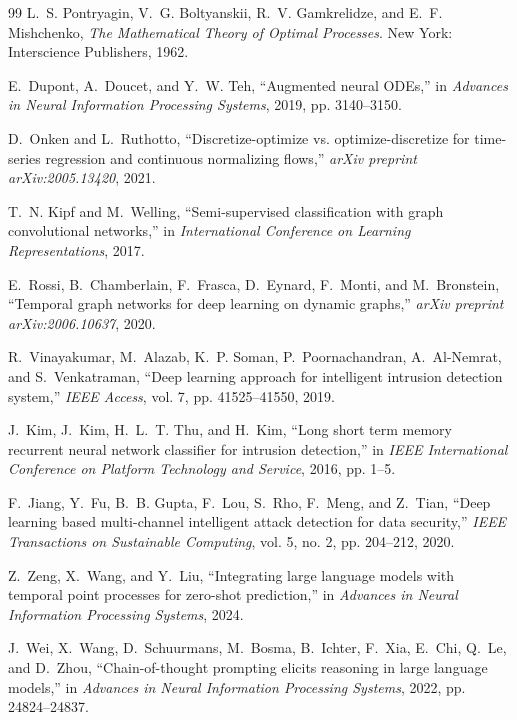\documentclass[lettersize,journal]{IEEEtran}
\begin{document}
\begin{thebibliography}{99}
L.~S. Pontryagin, V.~G. Boltyanskii, R.~V. Gamkrelidze, and E.~F. Mishchenko,
\emph{The Mathematical Theory of Optimal Processes}.
New York: Interscience Publishers, 1962.

E.~Dupont, A.~Doucet, and Y.~W. Teh,
``Augmented neural ODEs,''
in \emph{Advances in Neural Information Processing Systems}, 2019, pp. 3140--3150.

D.~Onken and L.~Ruthotto,
``Discretize-optimize vs. optimize-discretize for time-series regression and continuous normalizing flows,''
\emph{arXiv preprint arXiv:2005.13420}, 2021.

T.~N. Kipf and M.~Welling,
``Semi-supervised classification with graph convolutional networks,''
in \emph{International Conference on Learning Representations}, 2017.

E.~Rossi, B.~Chamberlain, F.~Frasca, D.~Eynard, F.~Monti, and M.~Bronstein,
``Temporal graph networks for deep learning on dynamic graphs,''
\emph{arXiv preprint arXiv:2006.10637}, 2020.

R.~Vinayakumar, M.~Alazab, K.~P. Soman, P.~Poornachandran, A.~Al-Nemrat, and S.~Venkatraman,
``Deep learning approach for intelligent intrusion detection system,''
\emph{IEEE Access}, vol. 7, pp. 41525--41550, 2019.

J.~Kim, J.~Kim, H.~L.~T. Thu, and H.~Kim,
``Long short term memory recurrent neural network classifier for intrusion detection,''
in \emph{IEEE International Conference on Platform Technology and Service}, 2016, pp. 1--5.

F.~Jiang, Y.~Fu, B.~B. Gupta, F.~Lou, S.~Rho, F.~Meng, and Z.~Tian,
``Deep learning based multi-channel intelligent attack detection for data security,''
\emph{IEEE Transactions on Sustainable Computing}, vol. 5, no. 2, pp. 204--212, 2020.

Z.~Zeng, X.~Wang, and Y.~Liu,
``Integrating large language models with temporal point processes for zero-shot prediction,''
in \emph{Advances in Neural Information Processing Systems}, 2024.

J.~Wei, X.~Wang, D.~Schuurmans, M.~Bosma, B.~Ichter, F.~Xia, E.~Chi, Q.~Le, and D.~Zhou,
``Chain-of-thought prompting elicits reasoning in large language models,''
in \emph{Advances in Neural Information Processing Systems}, 2022, pp. 24824--24837.


\end{thebibliography}
\end{document}
